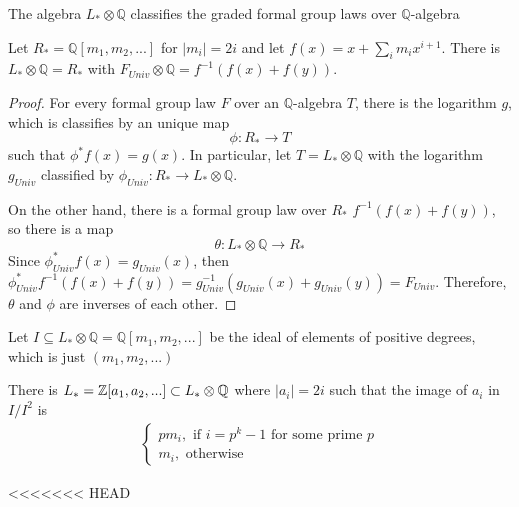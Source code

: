 The algebra $L_*\otimes \mathbb{Q}$ classifies the graded formal group laws over $\mathbb{Q}$-algebra
\begin{lemma}
    \cite{PreRavenelGreen}
    Let $R_*=\mathbb{Q}[m_1,m_2,...]$ for $|m_i|=2i$ and let $f(x)=x+\sum _i m_ix^{i+1}$. There is $L_*\otimes \mathbb{Q}=R_*$ with $F_{Univ}\otimes \mathbb{Q}=f^{-1}(f(x)+f(y))$.
\end{lemma}
\begin{proof}
    For every formal group law $F$ over an $\mathbb{Q}$-algebra $T$, there is the logarithm $g$, which is classifies by an unique map
    \[
    \phi: R_*\to T
    \]such that $\phi^*f(x)=g(x)$. In particular, let $T=L_*\otimes \mathbb{Q}$ with the logarithm $g_{Univ}$ classified by $\phi_{Univ}: R_*\to L_*\otimes\mathbb{Q}$. 

    On the other hand, there is a formal group law over $R_*$ $f^{-1}(f(x)+f(y))$, so there is a map 
    \[
  \theta:  L_*\otimes \mathbb{Q}\to R_*
    \]
    Since $\phi^*_{Univ}f(x)=g_{Univ}(x)$, then $\phi^*_{Univ}f^{-1}(f(x)+f(y))=g_{Univ}^{-1}(g_{Univ}(x)+g_{Univ}(y))=F_{Univ}$. Therefore, $\theta$ and $\phi$ are inverses of each other.

\end{proof}

Let $I\subseteq L_*\otimes \mathbb{Q}=\mathbb{Q}[m_1,m_2,...]$ be the ideal of elements of positive degrees, which is just $(m_1,m_2,...)$
\begin{theorem}
    \cite{ChrLazard1}
    There is $L_*=\mathbb{Z}[a_1,a_2,...]\subset L_*\otimes \mathbb{Q}$ where $|a_i|=2i$ such that the image of $a_i$ in $I/I^2$ is
    \begin{align*}
        \begin{cases}
            pm_i, \text{ if $i=p^k-1$ for some prime $p$}
            \\ m_i, \text{ otherwise}
        \end{cases}
    \end{align*}
\end{theorem}

<<<<<<< HEAD

